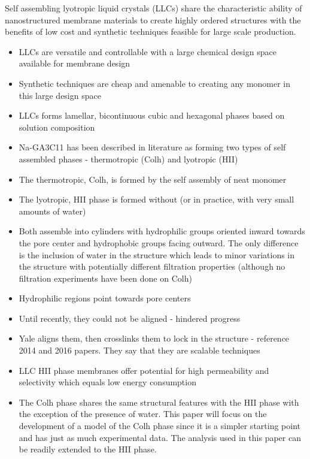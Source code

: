 \documentclass{article}
\begin{document}
	Self assembling lyotropic liquid crystals (LLCs) share the characteristic ability of nanostructured membrane materials to create highly ordered structures with the benefits of low cost and synthetic techniques feasible for large scale production.
	\begin{itemize}
		\item LLCs are versatile and controllable with a large chemical design space available for membrane design
		\item Synthetic techniques are cheap and amenable to creating any monomer in this large design space
		\item LLCs forms lamellar, bicontinuous cubic and hexagonal phases based on solution composition
		\item Na-GA3C11 has been described in literature as forming two types of self assembled phases - thermotropic (Colh) and lyotropic (HII)
		\item The thermotropic, Colh, is formed by the self assembly of neat monomer
		\item The lyotropic, HII phase is formed without (or in practice, with very small amounts of water)
		\item Both assemble into cylinders with hydrophilic groups oriented inward towards the pore center and hydrophobic groups facing outward. The only difference is the inclusion of water in the structure which leads to minor variations in the structure with potentially different filtration properties (although no filtration experiments have been done on Colh)  
		\item Hydrophilic regions point towards pore centers
		\item Until recently, they could not be aligned - hindered progress
		\item Yale aligns them, then crosslinks them to lock in the structure - reference 2014 and 2016 papers. They say that they are scalable techniques
		\item LLC HII phase membranes offer potential for high permeability and selectivity which equals low energy consumption
		\item The Colh phase shares the same structural features with the HII phase with the exception of the presence of water. This paper will focus on the development of a model of the Colh phase since it is a simpler starting point and has just as much experimental data. The analysis used in this paper can be readily extended to the HII phase. 
	\end{itemize}
	
\end{document}
